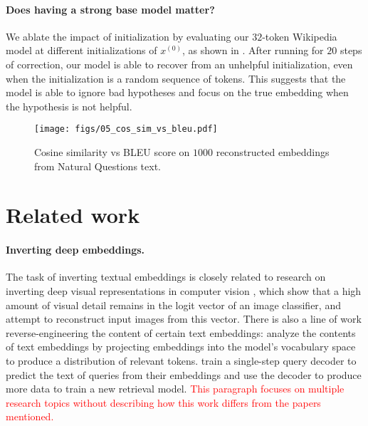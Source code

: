 \documentclass[11pt]{article}
\begin{document}
\paragraph{Does having a strong base model matter?}
We ablate the impact of initialization by evaluating our $32$-token Wikipedia model at different initializations of $x^{(0)}$, as shown in . After running for $20$ steps of correction, our model is able to recover from an unhelpful initialization, even when the initialization is a random sequence of tokens. This suggests that the model is able to ignore bad hypotheses and focus on the true embedding when the hypothesis is not helpful.



\begin{figure}[t]
    \centering
    \texttt{[image: figs/05\_cos\_sim\_vs\_bleu.pdf]}
    \caption{Cosine similarity vs BLEU score on $1000$ reconstructed embeddings from Natural Questions text.}
    \label{fig:05_cos_sim_vs_bleu}
\end{figure}

\section{Related work}

\paragraph{Inverting deep embeddings.} The task of inverting textual embeddings is closely related to research on inverting deep visual representations in computer vision \cite{mahendran2014UnderstandingDI,dosovitskiy2016inverting,teterwak2021understanding,bordes2021highfissl}, which show that a high amount of visual detail remains in the logit vector of an image classifier, and attempt to reconstruct input images from this vector. There is also a line of work reverse-engineering the content of certain text embeddings: \citet{ram2023token} analyze the contents of text embeddings by projecting embeddings into the model's vocabulary space to produce a distribution of relevant tokens. \citet{adolphs2022decoding} train a single-step query decoder to predict the text of queries from their embeddings and use the decoder to produce more data to train a new retrieval model.
\textcolor{red}{This paragraph focuses on multiple research topics without describing how this work differs from the papers mentioned.}
\end{document}
